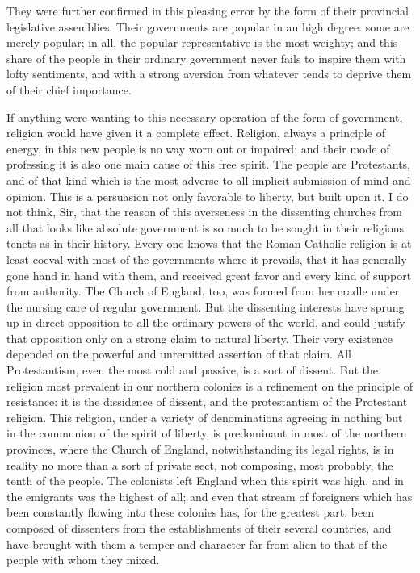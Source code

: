 They were further confirmed in this pleasing error by the form of their provincial legislative assemblies. Their governments are popular in an high degree: some are merely popular; in all, the popular representative is the most weighty; and this share of the people in their ordinary government never fails to inspire them with lofty sentiments, and with a strong aversion from whatever tends to deprive them of their chief importance.

If anything were wanting to this necessary operation of the form of government, religion would have given it a complete effect. Religion, always a principle of energy, in this new people is no way worn out or impaired; and their mode of professing it is also one main cause of this free spirit. The people are Protestants, and of that kind which is the most adverse to all implicit submission of mind and opinion. This is a persuasion not only favorable to liberty, but built upon it. I do not think, Sir, that the reason of this averseness in the dissenting churches from all that looks like absolute government is so much to be sought in their religious tenets as in their history. Every one knows that the Roman Catholic religion is at least coeval with most of the governments where it prevails, that it has generally gone hand in hand with them, and received great favor and every kind of support from authority. The Church of England, too, was formed from her cradle under the nursing care of regular government. But the dissenting interests have sprung up in direct opposition to all the ordinary powers of the world, and could justify that opposition only on a strong claim to natural liberty. Their very existence depended on the powerful and unremitted assertion of that claim. All Protestantism, even the most cold and passive, is a sort of dissent. But the religion most prevalent in our northern colonies is a refinement on the principle of resistance: it is the dissidence of dissent, and the protestantism of the Protestant religion. This religion, under a variety of denominations agreeing in nothing but in the communion of the spirit of liberty, is predominant in most of the northern provinces, where the Church of England, notwithstanding its legal rights, is in reality no more than a sort of private sect, not composing, most probably, the tenth of the people. The colonists left England when this spirit was high, and in the emigrants was the highest of all; and even that stream of foreigners which has been constantly flowing into these colonies has, for the greatest part, been composed of dissenters from the establishments of their several countries, and have brought with them a temper and character far from alien to that of the people with whom they mixed.

